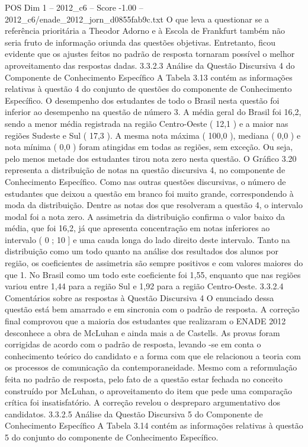 \begin{textsample}{POS Dim 1 – 2012\_c6 – Score -1.00 – 2012\_c6/enade\_2012\_jorn\_d0855fab9c.txt}
O que leva a questionar se a referência prioritária a Theodor Adorno e à Escola de Frankfurt também não seria fruto de informação oriunda das questões objetivas.
Entretanto, ficou evidente que os ajustes feitos no padrão de resposta tornaram possível o melhor aproveitamento das respostas dadas. 3.3.2.3 Análise da Questão Discursiva 4 do Componente de Conhecimento Específico A Tabela 3.13 contém as informações relativas à questão 4 do conjunto de questões do componente de Conhecimento Específico.
O desempenho dos estudantes de todo o Brasil nesta questão foi inferior ao desempenho na questão de número 3.
A média geral do Brasil foi 16,2, sendo a menor média registrada na região Centro-Oeste ( 12,1 ) e a maior nas regiões Sudeste e Sul ( 17,3 ).
A mesma nota máxima ( 100,0 ), mediana ( 0,0 ) e nota mínima ( 0,0 ) foram atingidas em todas as regiões, sem exceção.
Ou seja, pelo menos metade dos estudantes tirou nota zero nesta questão.
O Gráfico 3.20 representa a distribuição de notas na questão discursiva 4, no componente de Conhecimento Específico.
Como nas outras questões discursivas, o número de estudantes que deixou a questão em branco foi muito grande, correspondendo à moda da distribuição.
Dentre as notas dos que resolveram a questão 4, o intervalo modal foi a nota zero.
A assimetria da distribuição confirma o valor baixo da média, que foi 16,2, já que apresenta concentração em notas inferiores ao intervalo ( 0 ; 10 ] e uma cauda longa do lado direito deste intervalo.
Tanto na distribuição como um todo quanto na análise dos resultados dos alunos por região, os coeficientes de assimetria são sempre positivos e com valores maiores do que 1.
No Brasil como um todo este coeficiente foi 1,55, enquanto que nas regiões variou entre 1,44 para a região Sul e 1,92 para a região Centro-Oeste. 3.3.2.4 Comentários sobre as respostas à Questão Discursiva 4 O enunciado dessa questão está bem amarrado e em sincronia com o padrão de resposta.
A correção final comprovou que a maioria dos estudantes que realizaram o ENADE 2012 desconhece a obra de McLuhan e ainda mais a de Castells.
As provas foram corrigidas de acordo com o padrão de resposta, levando -se em conta o conhecimento teórico do candidato e a forma com que ele relacionou a teoria com os processos de comunicação da contemporaneidade.
Mesmo com a reformulação feita no padrão de resposta, pelo fato de a questão estar fechada no conceito construído por McLuhan, o aproveitamento do item que pede uma comparação crítica foi insatisfatório.
A correção revelou o despreparo argumentativo dos candidatos. 3.3.2.5 Análise da Questão Discursiva 5 do Componente de Conhecimento Específico A Tabela 3.14 contém as informações relativas à questão 5 do conjunto do componente de Conhecimento Específico.

\end{textsample}
